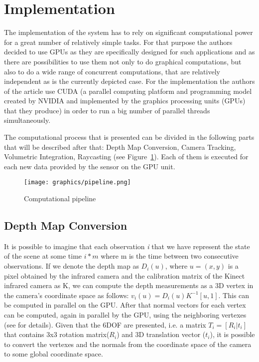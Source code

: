 \documentclass[11pt, a4paper]{article}
\theoremstyle{plain}
\begin{document}
\section{Implementation} %
\label{sec:Implementation}
  The implementation of the system has to rely on significant computational
  power for a great number of relatively simple tasks. For that purpose the
  authors decided to use GPUs as they are specifically designed for such
  applications and as there are possibilities to use them not only to do
  graphical computations, but also to do a wide range of concurrent
  computations, that are relatively independent as is the currently depicted
  case. For the implementation the authors of the article use CUDA (a parallel
  computing platform and programming model created by NVIDIA and implemented by
  the graphics processing units (GPUs) that they produce) in order to run a big
  number of parallel threads simultaneously. 

  The computational process that is presented can be divided in the following
  parts that will be described after that: Depth Map Conversion, Camera
  Tracking, Volumetric Integration, Raycasting (see Figure~\ref{fig:pipeline}).
  Each of them is executed for each new data provided by the sensor on the GPU
  unit.

  \begin{figure}
    \centering
    \texttt{[image: graphics/pipeline.png]}
    \caption{Computational pipeline}
    \label{fig:pipeline}
  \end{figure}

  \subsection{Depth Map Conversion} %
  \label{sub:Depth Map Conversion}
    It is possible to imagine that each observation \emph{i} that we have
    represent the state of the scene at some time $i * m$ where m is the time
    between two consecutive observations. If we denote the depth map as
    $D_i(u)$, where $u = (x, y)$ is a pixel obtained by the infrared camera and
    the calibration matrix of the Kinect infrared camera as K, we can compute
    the depth measurements as a 3D vertex in the camera's coordinate space as
    follows: $v_i(u) = D_i(u) K ^ {-1}[u, 1]$. This can be computed in parallel
    on the GPU. After that normal vectors for each vertex can be computed, again
    in parallel by the GPU, using the neighboring vertexes (see
    \cite{kinectfusion} for details).
    Given that the 6DOF are presented, i.e. a matrix $T_i = [R_i|t_i]$ that
    contains 3x3 rotation matrix($R_i$) and 3D translation vector ($t_i$), it is
    possible to convert the vertexes and the normals from the coordinate space
    of the camera to some global coordinate space.
\end{document}
